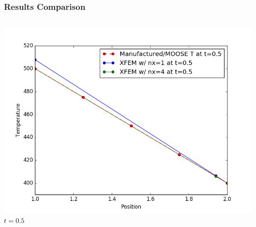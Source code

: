 \documentclass[]{beamer}
\begin{document}
\begin{frame}[t]\frametitle{Results Comparison}
  	\begin{columns}
			\begin{center}
			\includegraphics[scale=0.17]{figures/1D_rz_ls1m/1D_rz_ls1mat_u_vs_x_05}\\
			$t=0.5$
			
			\null
			

\end{center}
\end{columns}
\end{frame}
\end{document}

